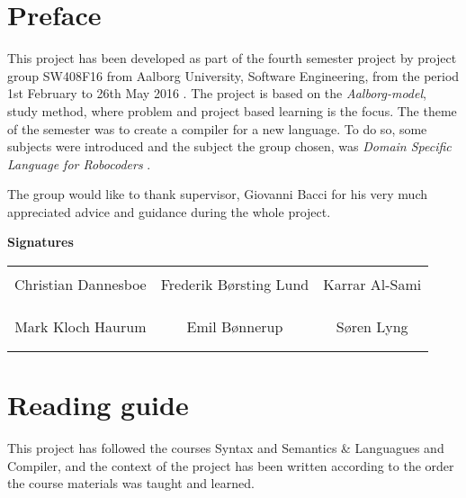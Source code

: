 \chapter*{Preface}
This project has been developed as part of the fourth semester project by project group SW408F16 from Aalborg University, Software Engineering, from the period 1st February to 26th May 2016 . \newline
The project is based on the \textit{Aalborg-model}, study method, where problem and project based learning is the focus. The theme of the semester was to create a compiler for a new language. To do so, some subjects were introduced and the subject the group chosen, was \textit{Domain Specific Language for Robocoders }. \newline

The group would like to thank supervisor, Giovanni Bacci for his very much appreciated advice and guidance during the whole project. 
\newline
\newline
\newline
\newline

{\Huge\textbf{Signatures}}
\newline
\newline

\begin{table}[H]
	\centering
		\begin{tabular}{c c c}
			\underline{\phantom{mmmmmmmmmmmmmm}} & \underline{\phantom{mmmmmmmmmmmmmm}} & \underline{\phantom{mmmmmmmmmmmmmm}} \\
			Christian Dannesboe			& Frederik Børsting Lund 		& Karrar Al-Sami 			\\
			&&\\
			&&\\
			\underline{\phantom{mmmmmmmmmmmmmm}} & \underline{\phantom{mmmmmmmmmmmmmm}} & \underline{\phantom{mmmmmmmmmmmmmm}} \\
			Mark Kloch Haurum			& Emil Bønnerup 		& Søren Lyng 				\\
			&&\\
			&&\\
		 																		
		\end{tabular}
\end{table}

\chapter*{Reading guide}
This project has followed the courses Syntax and Semantics \& Languagues and Compiler, and the context of the project has been written according to the order the course materials was taught and learned. \newline

